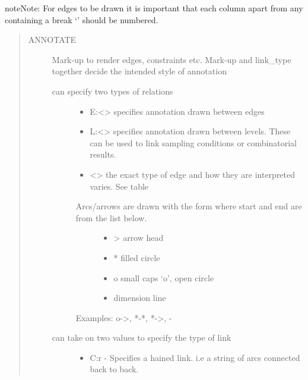 \documentclass[letterpaper,10pt,english]{sphinxmanual}
\begin{document}
\begin{sphinxadmonition}{note}{Note:}
For edges to be drawn it is important that each column apart from any
containing a break ‘\textbar{}’ should be numbered.
\end{sphinxadmonition}
\begin{quote}\begin{description}
\item[{ANNOTATE}] \leavevmode
Mark-up to render edges, constraints etc. Mark-up and link\_type
together decide the intended style of annotation
\begin{description}
\item[{ can specify two types of relations}] \leavevmode\begin{itemize}
\item {} 
E:\textless{}\textgreater{} specifies annotation drawn between edges

\item {} 
L:\textless{}\textgreater{} specifies annotation drawn between levels. These can be used to link sampling conditions or combinatorial results.

\item {} 
\textless{}\textgreater{} the exact type of edge and how they are interpreted varies. See table

\end{itemize}
\begin{description}
\item[{Arcs/arrows are drawn with the form  where start and end are from the list below.}] \leavevmode\begin{itemize}
\item {} 
\textgreater{}  arrow head

\item {} 
*  filled circle

\item {} 
o  small caps ‘o’, open circle

\item {} 
\textbar{}  dimension line

\end{itemize}

\end{description}

Examples: o-\textgreater{}, *-*, *-\textgreater{}, \textbar{}-\textbar{}

\item[{ can take on two values to specify the type of link}] \leavevmode\begin{itemize}
\item {} 
C:r - Specifies a hained link. i.e a string of arcs connected back to back.


\end{itemize}
\end{description}
\end{description}
\end{quote}
\end{document}
